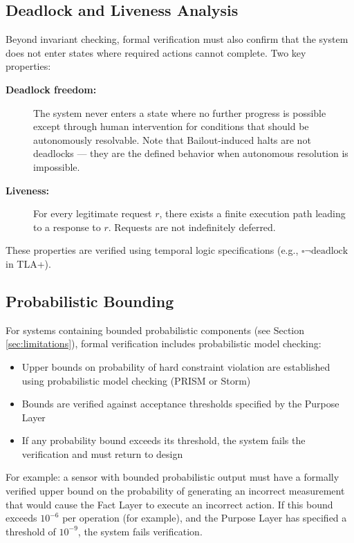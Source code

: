 \documentclass[12pt]{article}
\begin{document}
\subsection{Deadlock and Liveness Analysis}
Beyond invariant checking, formal verification must also confirm that the system does not enter states where required actions cannot complete. Two key properties:

\begin{description}
\item[\textbf{Deadlock freedom:}] The system never enters a state where no further progress is possible except through human intervention for conditions that should be autonomously resolvable. Note that Bailout-induced halts are not deadlocks — they are the defined behavior when autonomous resolution is impossible.
\item[\textbf{Liveness:}] For every legitimate request $r$, there exists a finite execution path leading to a response to $r$. Requests are not indefinitely deferred.
\end{description}

These properties are verified using temporal logic specifications (e.g., $\square \neg \text{deadlock}$ in TLA+).

\subsection{Probabilistic Bounding}
For systems containing bounded probabilistic components (see Section \ref{sec:limitations}), formal verification includes probabilistic model checking:

\begin{itemize}
\item Upper bounds on probability of hard constraint violation are established using probabilistic model checking (PRISM or Storm)
\item Bounds are verified against acceptance thresholds specified by the Purpose Layer
\item If any probability bound exceeds its threshold, the system fails the verification and must return to design
\end{itemize}

For example: a sensor with bounded probabilistic output must have a formally verified upper bound on the probability of generating an incorrect measurement that would cause the Fact Layer to execute an incorrect action. If this bound exceeds $10^{-6}$ per operation (for example), and the Purpose Layer has specified a threshold of $10^{-9}$, the system fails verification.
\end{document}
